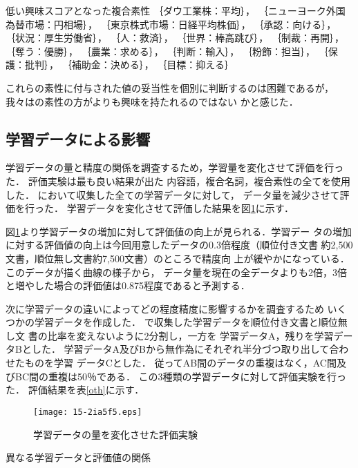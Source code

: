 \documentclass[japanese]{jnlp_1.4}
\newcounter{ex}
\def\ex#1{}
\def\exref#1{}
\def\secref#1{}
\begin{document}
\begin{itembox}{\ex{}\label{low}低い興味スコアとなった複合素性}
｛ダウ工業株：平均｝，
｛ニューヨーク外国為替市場：円相場｝，
｛東京株式市場：日経平均株価｝，
｛承認：向ける｝，
｛状況：厚生労働省｝，
｛人：救済｝，
｛世界：棒高跳び｝，
｛制裁：再開｝，
｛奪う：優勝｝，
｛農業：求める｝，
｛判断：輸入｝，
｛粉飾：担当｝，
｛保護：批判｝，
｛補助金：決める｝，
｛目標：抑える｝
\end{itembox}

これらの素性に付与された値の妥当性を個別に判断するのは困難であるが，
我々は\exref{high}の素性の方が\exref{low}よりも興味を持たれるのではない
かと感じた．



\subsection{学習データによる影響}

学習データの量と精度の関係を調査するため，学習量を変化させて評価を行った．
評価実験は最も良い結果が出た
内容語，複合名詞，複合素性の全てを使用した．
\secref{sec_collect_learn}において収集した全ての学習データに対して，
データ量を減少させて評価を行った．
学習データを変化させて評価した結果を図\ref{amount}に示す．

図\ref{amount}より学習データの増加に対して評価値の向上が見られる．学習デー
タの増加に対する評価値の向上は今回用意したデータの0.3倍程度（順位付き文書
約2,500文書，順位無し文書約7,500文書）のところで精度向
上が緩やかになっている．このデータが描く曲線の様子から，
データ量を現在の全データよりも2倍，3倍と増やした場合の評価値は0.875程度であると予測する．


次に学習データの違いによってどの程度精度に影響するかを調査するため
いくつかの学習データを作成した．
\secref{sec_collect_learn}で収集した学習データを順位付き文書と順位無し文
書の比率を変えないように2分割し，一方を
学習データA，残りを学習データBとした．
学習データA及びBから無作為にそれぞれ半分づつ取り出して合わせたものを学習
データCとした．
従ってAB間のデータの重複はなく，AC間及びBC間の重複は50％である．
この3種類の学習データに対して評価実験を行った．
評価結果を表\ref{oth}に示す．


\begin{figure}[t]
\begin{center}
\texttt{[image: 15-2ia5f5.eps]}
\end{center}
\caption{学習データの量を変化させた評価実験}
\label{amount}
\end{figure}
\begin{table}[t]
\caption{異なる学習データと評価値の関係}

\label{oth}
\end{table}
\end{document}
